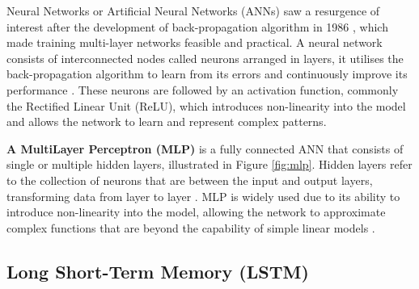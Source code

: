 Neural Networks or Artificial Neural Networks (ANNs) saw a resurgence of interest after the development of back-propagation algorithm in 1986 \cite{rumelhart-1986-ann}, which made training multi-layer networks feasible and practical. A neural network consists of interconnected nodes called neurons arranged in layers, it utilises the back-propagation algorithm to learn from its errors and continuously improve its performance \cite{aws-neural-network}. These neurons are followed by an activation function, commonly the Rectified Linear Unit (ReLU), which introduces non-linearity into the model and allows the network to learn and represent complex patterns.

\textbf{A MultiLayer Perceptron (MLP)} is a fully connected ANN that consists of single or multiple hidden layers, illustrated in Figure \ref{fig:mlp}. Hidden layers refer to the collection of neurons that are between the input and output layers, transforming data from layer to layer \cite{uzair-2020-hidden-layers}. MLP is widely used due to its ability to introduce non-linearity into the model, allowing the network to approximate complex functions that are beyond the capability of simple linear models \cite{popescue-2009-mlp}.




\subsection{Long Short-Term Memory (LSTM)}

